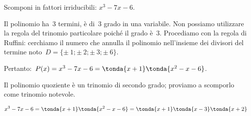\begin{esempio}{}{}
Scomponi in fattori irriducibili: \(x^3-7x-6\).

Il polinomio ha~3 termini, è di~3{\textdegree} grado in una variabile.
Non possiamo utilizzare la regola del trinomio particolare poiché il
grado è~3. Procediamo con la regola di Ruffini: cerchiamo il numero che 
annulla 
il polinomio nell'insieme dei divisori del termine
noto~\(D=\{\pm~1;\pm~2;\pm~3;\pm~6\}\).


Pertanto:~\(P(x)=x^3-7x-6=\tonda{x+1} \tonda{x^2-x-6}\).

Il polinomio quoziente è un trinomio di secondo grado; proviamo a
scomporlo come trinomio notevole.

\vspace{-1em}
\[x^{{3}}-7x-6 = 
\tonda{x+1} \tonda{x^2-x-6} = 
\tonda{x+1} \tonda{x-3} \tonda{x+2}\]
\end{esempio}
%  
% 
% 
% 
% 
% 
% 
% 
